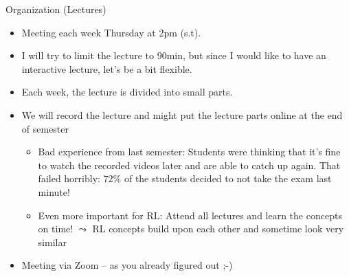 \begin{frame}[c]{Organization (Lectures)}
	
	\begin{itemize}
		\item Meeting each week Thursday at 2pm (s.t).
		\pause
		\item I will try to limit the lecture to 90min, but since I would like to have an interactive lecture, let's be a bit flexible.
		\pause
		\item Each week, the lecture is divided into small parts.
		\pause
		\item We will record the lecture and might put the lecture parts online at the end of semester
		\pause
		\begin{itemize}
			\item Bad experience from last semester: Students were thinking that it's fine to watch the recorded videos later and are able to catch up again. That failed horribly: $72\%$ of the students decided to not take the exam last minute!
			\pause
			\item Even more important for RL: Attend all lectures and learn the concepts on time!\newline
			$\leadsto$ RL concepts build upon each other and sometime look very similar
		\end{itemize}
		\pause
		\item Meeting via Zoom -- as you already figured out ;-)
	\end{itemize}
	
\end{frame}

